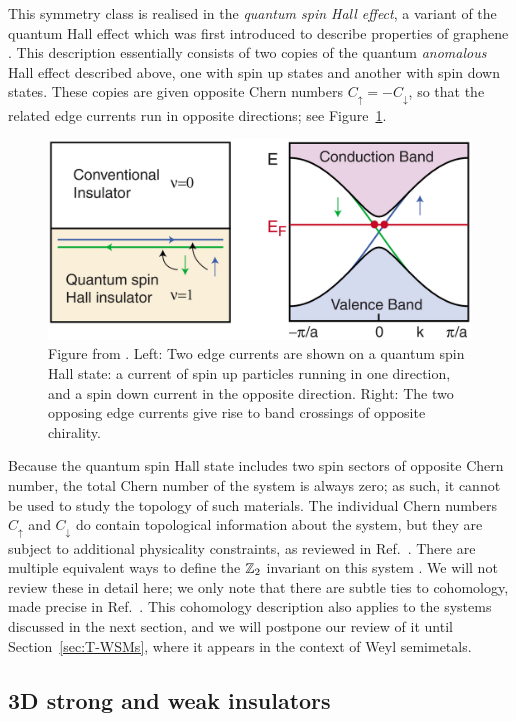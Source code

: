 This symmetry class is realised in the \emph{quantum spin Hall effect}, a variant of the quantum Hall effect which was first introduced to describe properties of graphene \cite{KaneMele_QSHE}. This description essentially consists of two copies of the quantum \emph{anomalous} Hall effect described above, one with spin up states and another with spin down states. These copies are given opposite Chern numbers $C_\uparrow = -C_\downarrow$, so that the related edge currents run in opposite directions; see Figure~\ref{fig:QSHE_edge-state}.
\begin{figure}[htb!]
	\centering
	\includegraphics[width=.75\linewidth]{Images/QSHE_edge-state}
	\caption{Figure from \cite{HasanKane_colloquium}. Left: Two edge currents are shown on a quantum spin Hall state: a current of spin up particles running in one direction, and a spin down current in the opposite direction.
		Right: The two opposing edge currents give rise to band crossings of opposite chirality.}
	\label{fig:QSHE_edge-state}
\end{figure}

Because the quantum spin Hall state includes two spin sectors of opposite Chern number, the total Chern number of the system is always zero; as such, it cannot be used to study the topology of such materials. The individual Chern numbers $C_\uparrow$ and $C_\downarrow$ do contain topological information about the system, but they are subject to additional physicality constraints, as reviewed in Ref.~\cite{Sato_superconductors}. There are multiple equivalent ways to define the $\mathbb{Z}_2$ invariant on this system \cite{KaneMele_QSHE-Z2,Sheng_QSHE,MooreBalents_TRS,QHZ_QSHE}. We will not review these in detail here; we only note that there are subtle ties to cohomology, made precise in Ref.~\cite{NittisGomi_FKMM}. This cohomology description also applies to the systems discussed in the next section, and we will postpone our review of it until Section~\ref{sec:T-WSMs}, where it appears in the context of Weyl semimetals.


\subsection{3D strong and weak insulators}\label{sec:3D-Z2}

